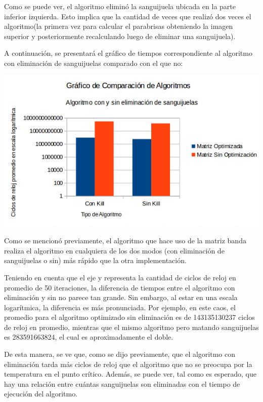 	\par 
	Como se puede ver, el algoritmo eliminó la sanguijuela ubicada en la parte inferior izquierda. Esto implica que la cantidad de veces que realizó dos veces el algoritmo(la primera vez para calcular el parabrisas obteniendo la imagen superior y posteriormente recalculando luego de eliminar una sanguijuela). 
	\par 
	A continuación, se presentará el gráfico de tiempos correspondiente al algoritmo con eliminación de sanguijuelas comparado con el que no:
\par 	
	\begin{center}
		\includegraphics[scale=0.5]{./img/comparacionkill.png}
	\end{center}
	
	\par 
	Como se mencionó previamente, el algoritmo que hace uso de la matriz banda realiza el algoritmo en cualquiera de los dos modos (con eliminación de sanguijuelas o sin) más rápido que la otra implementación. 
	\par 
	Teniendo en cuenta que el eje y representa la cantidad de ciclos de reloj en promedio de 50 iteraciones, la diferencia de tiempos entre el algoritmo con eliminación y sin no parece tan grande. Sin embargo, al estar en una escala logarítmica, la diferencia es más pronunciada. Por ejemplo, en este caos, el promedio para el algoritmo optimizado sin eliminación es de 143135130237 ciclos de reloj en promedio, mientras que el mismo algoritmo pero matando sanguijuelas es 283591663824, el cual es aproximadamente el doble.
	
	\par 
	De esta manera, se ve que, como se dijo previamente, que el algoritmo con eliminación tarda más ciclos de reloj que el algoritmo que no se preocupa por la temperatura en el punto crítico. Además, se puede ver, tal como es esperado, que hay una relación entre cuántas sanguijuelas son eliminadas con el tiempo de ejecución del algoritmo. 
	
